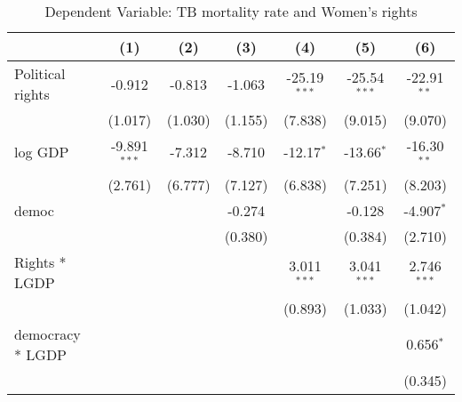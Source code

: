 \documentclass[9pt,letterpaper,subeqn]{beamer}
\begin{document}
\begin{frame}[label=placebo1]
%
\begin{table}[htbp]\centering
\scriptsize
\caption{Dependent Variable: TB mortality rate and Women's rights}
\begin{tabular}{l*{6}{c}}
\hline\hline
            &\multicolumn{1}{c}{(1)}&\multicolumn{1}{c}{(2)}&\multicolumn{1}{c}{(3)}&\multicolumn{1}{c}{(4)}&\multicolumn{1}{c}{(5)}&\multicolumn{1}{c}{(6)}\\
\hline
Political rights       &      -0.912         &      -0.813         &      -1.063         &      -25.19$^{***}$&      -25.54$^{***}$&      -22.91$^{**}$ \\
            &     (1.017)         &     (1.030)         &     (1.155)         &     (7.838)         &     (9.015)         &     (9.070)         \\

log GDP        &      -9.891$^{***}$&      -7.312         &      -8.710         &      -12.17$^{*}$  &      -13.66$^{*}$  &      -16.30$^{**}$ \\
            &     (2.761)         &     (6.777)         &     (7.127)         &     (6.838)         &     (7.251)         &     (8.203)         \\

democ       &                     &                     &      -0.274         &                     &      -0.128         &      -4.907$^{*}$  \\
            &                     &                     &     (0.380)         &                     &     (0.384)         &     (2.710)         \\

Rights * LGDP  &                     &                     &                     &       3.011$^{***}$&       3.041$^{***}$&       2.746$^{***}$\\
            &                     &                     &                     &     (0.893)         &     (1.033)         &     (1.042)         \\

democracy * LGDP   &                     &                     &                     &                     &                     &       0.656$^{*}$  \\
            &                     &                     &                     &                     &                     &     (0.345)         \\


\end{tabular}
\end{table}
\end{frame}
\end{document}
